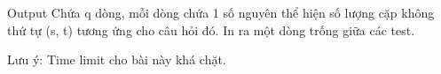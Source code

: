 Output
Chứa q dòng, mỗi dòng chứa 1 số nguyên thể hiện số lượng cặp không thứ tự (s, t) tương ứng cho câu hỏi đó. In ra một dòng trống giữa các test.  

   Lưu ý: Time limit cho bài này khá chặt.